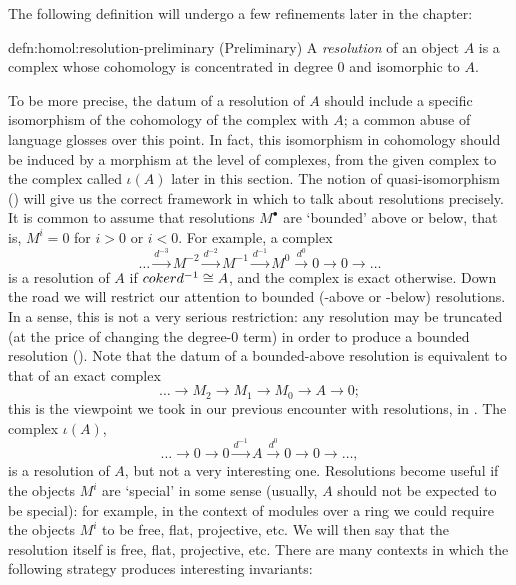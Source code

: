 The following definition will undergo a few refinements later in the
chapter:

\begin{defn}{}{defn:homol:resolution-preliminary}
  (Preliminary) A \emph{resolution} of an object $A$ is a complex
  whose cohomology is concentrated in degree 0 and isomorphic to $A$.
\end{defn}
To be more precise, the datum of a resolution of $A$ should include a
specific isomorphism of the cohomology of the complex with $A$; a
common abuse of language glosses over this point. In fact, this
isomorphism in cohomology should be induced by a morphism at the level
of complexes, from the given complex to the complex called $\iota(A)$
later in this section. The notion of quasi-isomorphism
() will give us the correct framework in
which to talk about resolutions precisely.  It is common to assume
that resolutions $M^\bullet$ are `bounded' above or below, that is,
$M^i = 0$ for $i > 0$ or $i < 0$. For example, a complex
\[
  \dots \xrightarrow{d^{-3}} M^{-2} \xrightarrow{d^{-2}} M^{-1}
  \xrightarrow{d^{-1}} M^0 \xrightarrow{d^0} 0 \longrightarrow 0
  \longrightarrow \dots
\]
is a resolution of $A$ if $coker d^{-1} \cong A$, and the complex is
exact otherwise. Down the road we will restrict our attention to
bounded (-above or -below) resolutions. In a sense, this is not a very
serious restriction: any resolution may be truncated (at the price of
changing the degree-0 term) in order to produce a bounded resolution
(). Note
that the datum of a bounded-above resolution is equivalent to that of
an exact complex
\[
  \dots \longrightarrow M_2 \longrightarrow M_1 \longrightarrow M_0
  \longrightarrow A \longrightarrow 0;
\]
this is the viewpoint we took in our previous encounter with
resolutions, in
.
The complex $\iota(A)$,
\[
  \dots \longrightarrow 0 \longrightarrow 0 \xrightarrow{d^{-1}} A
  \xrightarrow{d^0} 0 \longrightarrow 0 \longrightarrow \dots,
\]
is a resolution of $A$, but not a very interesting one. Resolutions
become useful if the objects $M^i$ are `special' in some sense
(usually, $A$ should not be expected to be special): for example, in
the context of modules over a ring we could require the objects $M^i$
to be free, flat, projective, etc. We will then say that the
resolution itself is free, flat, projective, etc.  There are many
contexts in which the following strategy produces interesting
invariants:

